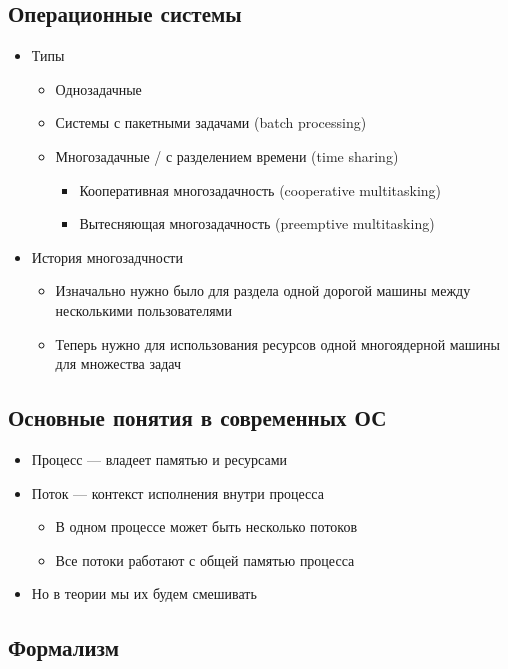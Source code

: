 \documentclass[10pt,a4paper,oneside,titlepage]{article}
\begin{document}
\subsection{Операционные системы}
\begin{itemize}
	\item Типы
	\begin{itemize}
		\item Однозадачные
		\item Системы с пакетными задачами (batch processing)
		\item Многозадачные / с разделением времени (time sharing)
		\begin{itemize}
			\item Кооперативная многозадачность (cooperative multitasking)
			\item Вытесняющая многозадачность (preemptive multitasking)
		\end{itemize}
	\end{itemize}
    \item История многозадчности
    \begin{itemize}
    	\item Изначально нужно было для раздела одной дорогой машины между несколькими пользователями
    	\item Теперь нужно для использования ресурсов одной многоядерной машины для множества задач
    \end{itemize}
\end{itemize}

\subsection{Основные понятия в современных ОС}
\begin{itemize}
	\item Процесс --- владеет памятью и ресурсами
	\item Поток --- контекст исполнения внутри процесса
	\begin{itemize}
		\item В одном процессе может быть несколько потоков
		\item Все потоки работают с общей памятью процесса
	\end{itemize}
    \item Но в теории мы их будем смешивать
\end{itemize}

\subsection{Формализм}
\end{document}
